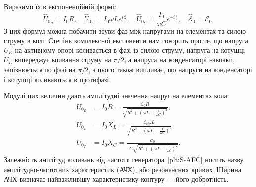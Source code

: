 \documentclass[]{LabWork}
\begin{document}
Виразимо їх в експоненційній формі:
\begin{equation*}
	\hat{U}_{0_R} = I_0 R,  \quad \hat{U}_{0_L} = I_0\omega Le^{i\frac{\pi}{2}}, \quad \hat{U}_{0_C} = \frac{I_0}{\omega C}e^{-i \frac{\pi}{2}}, \quad \hat{\mathcal{E}}_{0} = \mathcal{E}_0.
\end{equation*}
З цих формул можна побачити зсуви фаз між напругами на елементах та силою струму в колі. Степінь комплексної експоненти нам говорить про те, що напруга $U_R$ на активному опорі  коливається в фазі із силою струму, напруга на котушці $U_L$ випереджує коивання струму на $\pi/2$, а напруга на конденсаторі навпаки, запізнюється по фазі на $\pi/2$, з цього також випливає, що напруги на конденсаторі і котушці коливаються в протифазі.

Модулі цих величин дають амплітудні значення напруг на елементах кола:
\begin{align}
	U_{0_R} & = I_0R =   \frac{\mathcal{E}_0 R}{\sqrt{R^2  +   \left(  \omega L - \frac{1}{\omega C} \right)^2}}, \label{U0R}       \\
	U_{0_L} & = I_0X_L = \frac{\mathcal{E}_0 \omega L}{\sqrt{R^2  +   \left(  \omega L - \frac{1}{\omega C} \right)^2}} \label{U0L} \\
	U_{0_C} & = I_0X_C = \frac{\mathcal{E}_0}{\omega C\sqrt{R^2  +   \left(  \omega L - \frac{1}{\omega C} \right)^2}}\label{U0C}.
\end{align}
Залежність амплітуд коливань від частоти генератора~\ref{plt:S-AFC} носить назву амплітудно-частотних характеристик (АЧХ), або резонансних кривих. Ширина АЧХ визначає найважливішу характеристику контуру --- його добротність.
\end{document}
